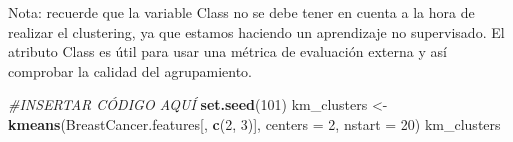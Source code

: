 \documentclass[
]{article}
\newenvironment{Shaded}{\begin{snugshade}}{\end{snugshade}}
\newcommand{\CommentTok}[1]{\textcolor[rgb]{0.56,0.35,0.01}{\textit{#1}}}
\newcommand{\DataTypeTok}[1]{\textcolor[rgb]{0.13,0.29,0.53}{#1}}
\newcommand{\DecValTok}[1]{\textcolor[rgb]{0.00,0.00,0.81}{#1}}
\newcommand{\KeywordTok}[1]{\textcolor[rgb]{0.13,0.29,0.53}{\textbf{#1}}}
\newcommand{\NormalTok}[1]{#1}
\newcommand{\StringTok}[1]{\textcolor[rgb]{0.31,0.60,0.02}{#1}}
\begin{document}
Nota: recuerde que la variable Class no se debe tener en cuenta a la
hora de realizar el clustering, ya que estamos haciendo un aprendizaje
no supervisado. El atributo Class es útil para usar una métrica de
evaluación externa y así comprobar la calidad del agrupamiento.

\begin{Shaded}
\begin{Highlighting}[]
\CommentTok{#INSERTAR CÓDIGO AQUÍ}
\KeywordTok{set.seed}\NormalTok{(}\DecValTok{101}\NormalTok{)}
\NormalTok{km_clusters <-}\StringTok{ }\KeywordTok{kmeans}\NormalTok{(BreastCancer.features[, }\KeywordTok{c}\NormalTok{(}\DecValTok{2}\NormalTok{, }\DecValTok{3}\NormalTok{)], }\DataTypeTok{centers =} \DecValTok{2}\NormalTok{, }\DataTypeTok{nstart =} \DecValTok{20}\NormalTok{)}
\NormalTok{km_clusters}
\end{Highlighting}
\end{Shaded}
\end{document}
